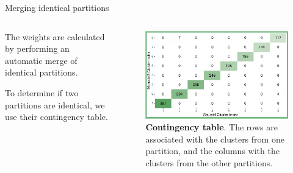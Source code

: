 \begin{frame}{Merging identical partitions}
    \begin{columns}
        \begin{column}{0.45\textwidth}
            \justifying

            The weights are calculated by performing an automatic merge of identical partitions.
            \bigskip

            To determine if two partitions are identical, we use their contingency table.
        \end{column}

        \begin{column}{0.5\textwidth}
            \begin{figure}
                \centering
                \includegraphics[width=\textwidth]{images/ch2/2_cont_table.png}
                \caption{\justifying \textbf{Contingency table}. The rows are associated with the clusters from one partition, and the columns with the clusters from the other partitions. }
            \end{figure}
        \end{column}
    \end{columns}
    
\end{frame}
